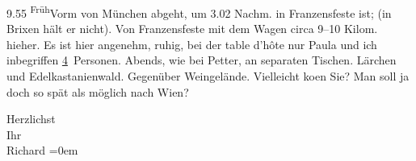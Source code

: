                   9.55{ }\substVorne{}\textsuperscript{Früh}\substDazwischen{}Vorm\substHinten{} von München abgeht, um 3.02
                  Nachm. in Franzensfeste ist;  (in Brixen
               hält er nicht). Von Franzensfeste mit dem Wagen
               circa 9–10 Kilom. hieher. Es ist hier angenehm, ruhig, bei der table d’hôte nur Paula und ich inbegriffen \uline{4} Personen. Abends, wie bei Petter,
               an separaten Tischen. Lärchen und Edelkastanienwald. Gegenüber Weingelände.
               Vielleicht ko{\geminationm}en Sie? Man soll ja doch so spät als
               möglich nach Wien?\pend
           
\pstart
           Herzlichst{\\[\baselineskip]}Ihr{\\[\baselineskip]}\spacefill\mbox{Richard}\pend
           \leftskip=0em{}\endnumbering{}  \newcommand{\dateiname}{L00973}\newcommand{\titel}{Richard Beer-Hofmann an Arthur Schnitzler, 12. 9. 1899}\newcommand{\editorInnen}{Martin Anton Müller und Gerd-Hermann Susen}
